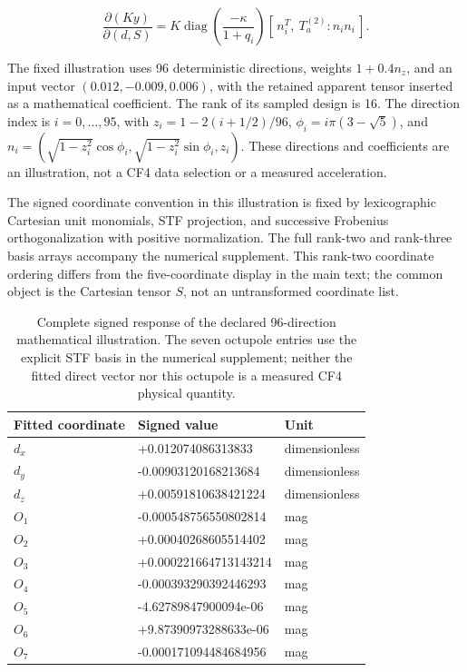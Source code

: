 \begin{equation}
\frac{\partial(Ky)}{\partial(d,S)}
 =K\operatorname{diag}\!\left(\frac{-\kappa}{1+q_i}\right)
       [\,n_i^T,\ T_a^{(2)}:n_in_i\,].\tag{A7}
\end{equation}

The fixed illustration uses 96 deterministic directions, weights
\(1+0.4n_z\), and an input vector \((0.012,-0.009,0.006)\), with the
retained apparent tensor inserted as a mathematical coefficient. The
rank of its sampled design is 16. The direction index is
\(i=0,\ldots,95\), with \(z_i=1-2(i+1/2)/96\),
\(\phi_i=i\pi(3-\sqrt5)\), and
\(n_i=(\sqrt{1-z_i^2}\cos\phi_i,\sqrt{1-z_i^2}\sin\phi_i,z_i)\). These
directions and coefficients are an illustration, not a CF4 data
selection or a measured acceleration.

The signed coordinate convention in this illustration is fixed by
lexicographic Cartesian unit monomials, STF projection, and successive
Frobenius orthogonalization with positive normalization. The full
rank-two and rank-three basis arrays accompany the numerical supplement.
This rank-two coordinate ordering differs from the five-coordinate
display in the main text; the common object is the Cartesian tensor
\(S\), not an untransformed coordinate list.

\begin{table}[htbp]
\centering\small
\caption{Complete signed response of the declared 96-direction mathematical
illustration. The seven octupole entries use the explicit STF basis in
the numerical supplement; neither the fitted direct vector nor this
octupole is a measured CF4 physical quantity.}\label{tab:opticalsigned}
\begin{tabular}{lll}
\hline
Fitted coordinate & Signed value & Unit \\
\hline
$d_x$ & +0.012074086313833 & dimensionless \\
$d_y$ & -0.00903120168213684 & dimensionless \\
$d_z$ & +0.00591810638421224 & dimensionless \\
$O_1$ & -0.000548756550802814 & mag \\
$O_2$ & +0.00040268605514402 & mag \\
$O_3$ & +0.000221664713143214 & mag \\
$O_4$ & -0.000393290392446293 & mag \\
$O_5$ & -4.62789847900094e-06 & mag \\
$O_6$ & +9.87390973288633e-06 & mag \\
$O_7$ & -0.000171094484684956 & mag \\
\hline
\end{tabular}
\end{table}

